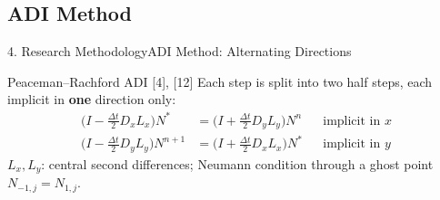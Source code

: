 \documentclass[10pt]{beamer}
\begin{document}
  \subsection{ADI Method}
    \begin{frame}{4. Research Methodology}{ADI Method: Alternating Directions}
      \begin{block}{Peaceman--Rachford ADI \hfill [4], [12]}
          Each step is split into two half steps, each implicit in \textbf{one} direction only:
          $$
          \begin{aligned}
          \Big(I - \tfrac{\Delta t}{2} D_x L_x\Big) N^{*} &= \Big(I + \tfrac{\Delta t}{2} D_y L_y\Big) N^{n} & &\text{implicit in } x \\
          \Big(I - \tfrac{\Delta t}{2} D_y L_y\Big) N^{n+1} &= \Big(I + \tfrac{\Delta t}{2} D_x L_x\Big) N^{*} & &\text{implicit in } y
          \end{aligned}
          $$
          {\small $L_x, L_y$: central second differences; Neumann condition through a ghost point $N_{-1,j} = N_{1,j}$.}
      \end{block}
      \begin{center}
      \end{center}
    \end{frame}
\end{document}
